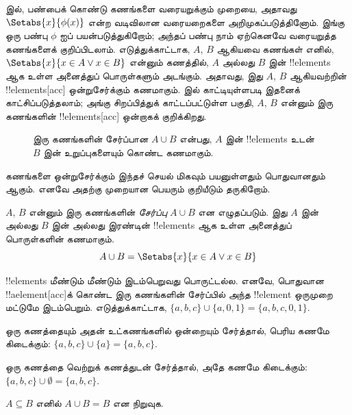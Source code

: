 \documentclass[../../../include/open-logic-section]{subfiles}
\begin{document}

\begin{explain}
 இல், பண்பைக் கொண்டு கணங்களை வரையறுக்கும் முறையை,
அதாவது $\Setabs{x}{\phi(x)}$ என்ற வடிவிலான வரையறைகளை அறிமுகப்படுத்தினோம்.
இங்கு ஒரு பண்பு $\phi$ ஐப் பயன்படுத்துகிறோம்; அந்தப் பண்பு நாம் ஏற்கெனவே
வரையறுத்த கணங்களைக் குறிப்பிடலாம். எடுத்துக்காட்டாக, $A$, $B$ ஆகியவை
கணங்கள் எனில், $\Setabs{x}{x \in A \lor x \in B}$ என்னும் கணத்தில்,
$A$ அல்லது $B$ இன் !!{element}s ஆக உள்ள அனைத்துப் பொருள்களும் அடங்கும்.
அதாவது, இது $A$, $B$ ஆகியவற்றின் !!{element}s[acc] ஒன்றுசேர்க்கும் கணமாகும்.
 இல் காட்டியுள்ளபடி இதனைக் காட்சிப்படுத்தலாம்;
அங்கு சிறப்பித்துக் காட்டப்பட்டுள்ள பகுதி, $A$, $B$ என்னும் இரு கணங்களின்
!!{element}s[acc] ஒன்றாகக் குறிக்கிறது.

\begin{figure}
  \caption{இரு கணங்களின் சேர்ப்பான $A \cup B$ என்பது, $A$ இன்
  !!{element}s உடன் $B$ இன் உறுப்புகளையும் கொண்ட கணமாகும்.}
\end{figure}

கணங்களை ஒன்றுசேர்க்கும் இந்தச் செயல் மிகவும் பயனுள்ளதும் பொதுவானதும் ஆகும்.
எனவே அதற்கு முறையான பெயரும் குறியீடும் தருகிறோம்.
\end{explain}

\begin{defn}[சேர்ப்பு]
$A$, $B$ என்னும் இரு கணங்களின் \emph{சேர்ப்பு} $A \cup B$ என எழுதப்படும்.
இது $A$ இன் அல்லது $B$ இன் அல்லது இரண்டின் !!{element}s ஆக உள்ள
அனைத்துப் பொருள்களின் கணமாகும்.
\[
A \cup B = \Setabs{x}{x \in A \lor x \in B}
\]
\end{defn}

\begin{ex}
!!{element}s மீண்டும் மீண்டும் இடம்பெறுவது பொருட்டல்ல.
எனவே, பொதுவான !!a{element}[acc]க் கொண்ட இரு கணங்களின் சேர்ப்பில்
அந்த !!{element} ஒருமுறை மட்டுமே இடம்பெறும். எடுத்துக்காட்டாக,
$\{ a, b, c\} \cup \{ a, 0, 1\} = \{a, b, c, 0, 1\}$.

ஒரு கணத்தையும் அதன் உட்கணங்களில் ஒன்றையும் சேர்த்தால்,
பெரிய கணமே கிடைக்கும்:
$\{a, b, c \} \cup \{a \} = \{a, b, c\}$.

ஒரு கணத்தை வெற்றுக் கணத்துடன் சேர்த்தால், அதே கணமே கிடைக்கும்:
$\{a, b, c \} \cup \emptyset = \{a, b, c \}$.
\end{ex}

\begin{prob}
$A \subseteq B$ எனில் $A \cup B = B$ என நிறுவுக.
\end{prob}
\end{document}
